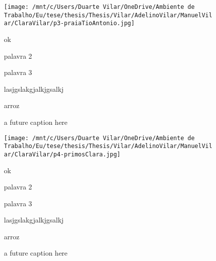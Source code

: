 \documentclass{article}
\begin{document}
    \begin{figure}[ht!]
        \begin{minipage}{0.35\textwidth}
            \centering
            \texttt{[image: /mnt/c/Users/Duarte Vilar/OneDrive/Ambiente de Trabalho/Eu/tese/thesis/Thesis/Vilar/AdelinoVilar/ManuelVilar/ClaraVilar/p3-praiaTioAntonio.jpg]}
            \caption{a future caption here}
        \end{minipage}
        \hspace{1cm} %
        \begin{minipage}{0.3\textwidth}
            ok

            palavra 2

            palavra 3

            lasjgslakgjalkjgsalkj

            arroz
            
        \end{minipage}
    \end{figure}



    \begin{figure}[ht!]
        \begin{minipage}{0.35\textwidth}
            \centering
            \texttt{[image: /mnt/c/Users/Duarte Vilar/OneDrive/Ambiente de Trabalho/Eu/tese/thesis/Thesis/Vilar/AdelinoVilar/ManuelVilar/ClaraVilar/p4-primosClara.jpg]}
            \caption{a future caption here}
        \end{minipage}
        \hspace{1cm} %
        \begin{minipage}{0.3\textwidth}
            ok

            palavra 2

            palavra 3

            lasjgslakgjalkjgsalkj

            arroz
            
        \end{minipage}
    \end{figure}
\end{document}
